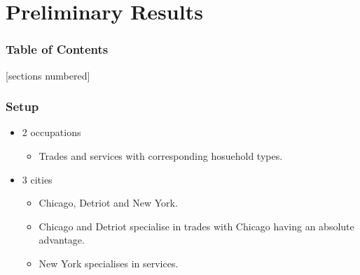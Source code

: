 \documentclass[serif, 9pt, aspectratio=32]{beamer}
\begin{document}
\section{Preliminary Results}

\begin{frame}
    \frametitle{Table of Contents}
    [sections numbered]
    \tableofcontents[currentsection]
\end{frame}

\begin{frame}
    \centering
    \frametitle{Setup}
    \begin{itemize}
        \setlength{\itemsep}{3em}
        \item 2 occupations
              \begin{itemize}
                  \item Trades and services with corresponding hosuehold types.
              \end{itemize}
        \item 3 cities
              \begin{itemize}
                  \setlength{\itemsep}{1em}
                  \item Chicago, Detriot and New York.
                  \item Chicago and Detriot specialise in trades with Chicago having an absolute advantage.
                  \item New York specialises in services.
              \end{itemize}
    \end{itemize}
\end{frame}
\end{document}
